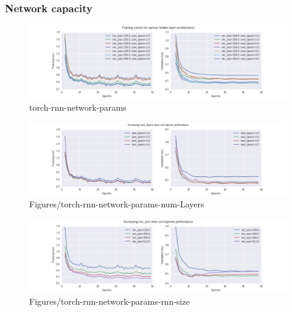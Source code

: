 \documentclass[dissertation.tex]{subfiles}
\begin{document}

\subsubsection{Network capacity}

\begin{figure}[htpb]
    \centering
    \includegraphics[width=\linewidth]{Figures/torch-rnn-network-params.png}
    \caption{torch-rnn-network-params}
    \label{fig:torch-rnn-network-params}
\end{figure}

\begin{figure}[htpb]
  \centering
  \includegraphics[width=1.0\linewidth]{Figures/torch-rnn-network-params-num-layers.png}
  \caption{Figures/torch-rnn-network-params-num-Layers}
  \label{fig:Figures/torch-rnn-network-params-num-layers}
\end{figure}

\begin{figure}[htpb]
  \centering
  \includegraphics[width=1.0\linewidth]{Figures/torch-rnn-network-params-rnn-size.png}
  \caption{Figures/torch-rnn-network-params-rnn-size}
  \label{fig:Figures/torch-rnn-network-params-rnn-size}
\end{figure}
\end{document}
